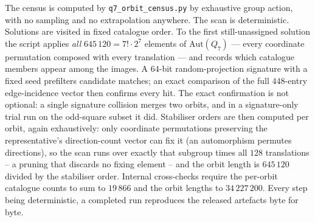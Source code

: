 \documentclass[12pt]{article}
\begin{document}
The census is computed by \texttt{q7\_orbit\_census.py} by exhaustive
group action, with no sampling and no extrapolation anywhere. The scan is
deterministic. Solutions are visited in fixed catalogue order. To the
first still-unassigned solution the script applies \emph{all}
$645\,120=7!\cdot2^{7}$ elements of $\mathrm{Aut}(Q_7)$ --- every
coordinate permutation composed with every translation --- and records
which catalogue members appear among the images. A $64$-bit
random-projection signature with a fixed seed prefilters candidate
matches; an exact comparison of the full $448$-entry edge-incidence
vector then confirms every hit. The exact
confirmation is not optional: a single signature collision merges two
orbits, and in a signature-only trial run on the odd-square subset it did.
Stabiliser orders are then computed per orbit, again exhaustively: only
coordinate permutations preserving the representative's direction-count
vector can fix it (an automorphism permutes directions), so the scan runs
over exactly that subgroup times all $128$ translations -- a pruning that
discards no fixing element -- and the orbit length is $645\,120$ divided
by the stabiliser order. Internal cross-checks require the per-orbit
catalogue counts to sum to $19\,866$ and the orbit lengths to
$34\,227\,200$. Every step being deterministic, a completed run
reproduces the released artefacts byte for byte.
\end{document}
